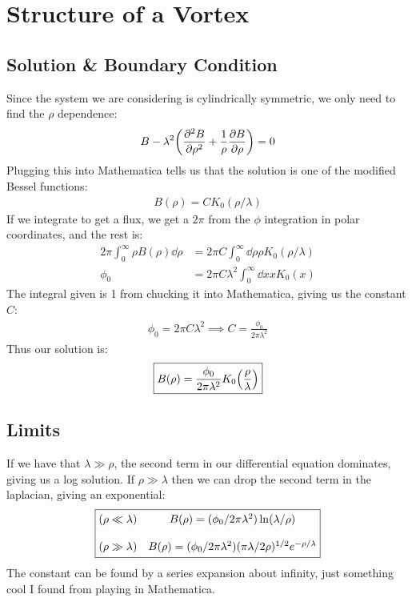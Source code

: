 \documentclass[12pt]{article}
\begin{document}
\section{Structure of a Vortex}
\subsection{Solution \& Boundary Condition}
Since the system we are considering is cylindrically symmetric, we only need to find the $\rho$ dependence:
\begin{align*}
  B-\lambda^2\qty(\pdv[2]{B}{\rho}+\frac1\rho\pdv{B}{\rho})=0
\end{align*}
Plugging this into Mathematica tells us that the solution is one of the modified Bessel functions:
\begin{align*}
  B(\rho)=CK_0(\rho/\lambda)
\end{align*}
If we integrate to get a flux, we get a $2\pi$ from the $\phi$ integration in polar coordinates, and the rest is:
\begin{align*}
  2\pi\int_0^\infty\rho B(\rho)\dd{\rho}&=2\pi C
  \int_0^\infty\dd{\rho}\rho K_0(\rho/\lambda)\\
  \phi_0&=2\pi C\lambda^2\int_0^\infty\dd{x}xK_0(x)
\end{align*}
The integral given is 1 from chucking it into Mathematica, giving us the constant $C$:
\begin{align*}
  \phi_0=2\pi C\lambda^2\implies \boxed{C=\frac{\phi_0}{2\pi\lambda^2}}
\end{align*}
Thus our solution is:
\begin{align*}
  \boxed{B(\rho)=\frac{\phi_0}{2\pi\lambda^2}K_0\qty(\frac{\rho}{\lambda})}
\end{align*}
\subsection{Limits}
If we have that $\lambda\gg\rho$, the second term in our differential equation dominates, giving us a log solution. If $\rho\gg\lambda$ then we can drop the second term in the laplacian, giving an exponential:
\begin{align*}
  \boxed{
    \mqty{(\rho\ll\lambda)&B(\rho)=(\phi_0/2\pi\lambda^2)\ln(\lambda/\rho)\\\\
    (\rho\gg\lambda)&B(\rho)=(\phi_0/2\pi\lambda^2)(\pi\lambda/2\rho)^{1/2}
    e^{-\rho/\lambda}}}
\end{align*}
The constant can be found by a series expansion about infinity, just something cool I found from playing in Mathematica. 
\end{document}
